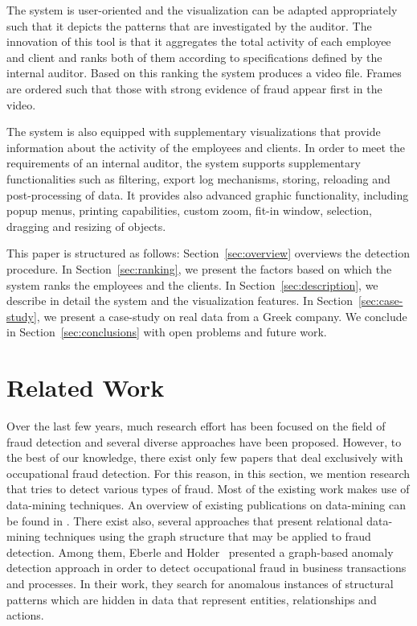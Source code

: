 \documentclass[conference]{IEEEtran}
\begin{document}
The system is user-oriented and the visualization can be adapted
appropriately such that it depicts the patterns that are
investigated by the auditor. The innovation of this tool is that it
aggregates the total activity of each employee and client and ranks
both of them according to specifications defined by the internal
auditor. Based on this ranking the system produces a video file.
Frames are ordered such that those with strong evidence of fraud
appear first in the video.

The system is also equipped with supplementary visualizations that
provide information about the activity of the employees and clients.
In order to meet the requirements of an internal auditor, the system
supports supplementary functionalities such as filtering, export log
mechanisms, storing, reloading and post-processing of data. It
provides also advanced graphic functionality, including popup menus,
printing capabilities, custom zoom, fit-in window, selection,
dragging and resizing of objects.

This paper is structured as follows: Section~\ref{sec:overview}
overviews the detection procedure. In Section~\ref{sec:ranking}, we
present the factors based on which the system ranks the employees
and the clients. In Section~\ref{sec:description}, we describe in
detail the system and the visualization features. In
Section~\ref{sec:case-study}, we present a case-study on real data
from a Greek company. We conclude in Section~\ref{sec:conclusions}
with open problems and future work.


\section{Related Work}
\label{sec:previous-work}

Over the last few years, much research effort has been focused on
the field of fraud detection and several diverse approaches have
been proposed. However, to the best of our knowledge, there exist
only few papers that deal exclusively with occupational fraud
detection. For this reason, in this section, we mention research
that tries to detect various types of fraud. Most of the existing
work makes use of data-mining techniques. An overview of existing
publications on data-mining can be found in \cite{BH02, KLSH04,
Lue10, PKSG10}. There exist also, several approaches that present
relational data-mining techniques using the graph structure that may
be applied to fraud detection. Among them, Eberle and
Holder~\cite{EH09} presented a graph-based anomaly detection
approach in order to detect occupational fraud in business
transactions and processes. In their work, they search for anomalous
instances of structural patterns which are hidden in data that
represent entities, relationships and actions.
\end{document}
